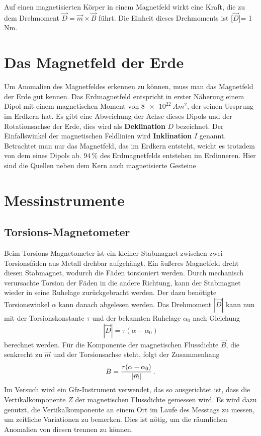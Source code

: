 Auf einen magnetisierten Körper in einem Magnetfeld wirkt eine Kraft, die zu dem Drehmoment $\vec{D} = \vec{m} \times \vec{B}$ führt. Die Einheit dieses Drehmoments ist [$\vec{D}$]= 1\,Nm.

\section{Das Magnetfeld der Erde}
Um Anomalien des Magnetfeldes erkennen zu können, muss man das Magnetfeld der Erde gut kennen.
Das Erdmagnetfeld entspricht in erster Näherung einem Dipol mit einem magnetischen Moment von $\SI{8 e22}{Am^2}$, der seinen Ursprung im Erdkern hat. Es gibt eine Abweichung der Achse dieses Dipols und der 
Rotationsachse der Erde, dies wird als \textbf{Deklination} $D$ bezeichnet. 
Der Einfallswinkel der magnetischen Feldlinien wird \textbf{Inklination} $I$ genannt.
Betrachtet man nur das Magnetfeld, das im Erdkern entsteht, weicht es trotzdem von dem eines Dipols ab. 94\,\% des Erdmagnetfelds entstehen im Erdinneren. Hier sind die Quellen neben dem Kern auch magnetisierte Gesteine 

\section{Messinstrumente}

\subsection{Torsions-Magnetometer}

Beim Torsions-Magnetometer ist ein kleiner Stabmagnet zwischen zwei Torsionsfäden aus Metall drehbar aufgehängt. Ein äußeres Magnetfeld dreht diesen Stabmagnet, wodurch die Fäden torsioniert werden. Durch mechanisch verursachte Torsion der Fäden in die andere Richtung, kann der Stabmagnet wieder in seine Ruhelage zurückgebracht werden. Der dazu benötigte Torsionswinkel $\alpha$ kann danach abgelesen werden. Das Drehmoment $|\vec{D}|$ kann nun mit der Torsionskonstante $\tau$ und der bekannten Ruhelage $\alpha_0$ nach Gleichung
\begin{equation}
 |\vec{D}|=\tau(\alpha-\alpha_0)
\end{equation}
berechnet werden. Für die Komponente der magnetischen Flussdichte $\vec{B}$, die senkrecht zu $\vec{m}$ und der Torsionsachse steht, folgt der Zusammenhang
\begin{equation}
 B=\frac{\tau(\alpha-\alpha_0)}{|\vec{m}|} \text{\,.}
 \label{eq:Umrechnung_Torsion}
\end{equation}
Im Versuch wird ein Gfz-Instrument verwendet, das so ausgerichtet ist, dass die Vertikalkomponente $Z$ der magnetischen Flussdichte gemessen wird. Es wird dazu genutzt, die Vertikalkomponente an einem Ort im Laufe des Messtags zu messen, um zeitliche Variationen zu bemerken. Dies ist nötig, um die räumlichen Anomalien von diesen trennen zu können.

